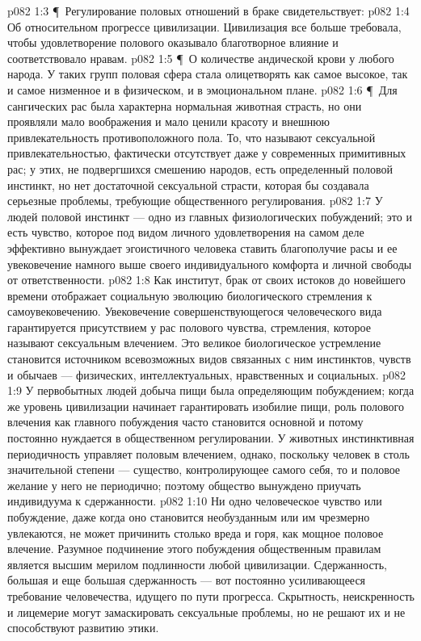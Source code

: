 \vs p082 1:3 \P\ Регулирование половых отношений в браке свидетельствует:
\vs p082 1:4 \bibnobreakspace Об относительном прогрессе цивилизации. Цивилизация все больше требовала, чтобы удовлетворение полового оказывало благотворное влияние и соответствовало нравам.
\vs p082 1:5 \P\ \bibnobreakspace О количестве андической крови у любого народа. У таких групп половая сфера стала олицетворять как самое высокое, так и самое низменное и в физическом, и в эмоциональном плане.
\vs p082 1:6 \P\ Для сангических рас была характерна нормальная животная страсть, но они проявляли мало воображения и мало ценили красоту и внешнюю привлекательность противоположного пола. То, что называют сексуальной привлекательностью, фактически отсутствует даже у современных примитивных рас; у этих, не подвергшихся смешению народов, есть определенный половой инстинкт, но нет достаточной сексуальной страсти, которая бы создавала серьезные проблемы, требующие общественного регулирования.
\vs p082 1:7 У людей половой инстинкт --- одно из главных физиологических побуждений; это и есть чувство, которое под видом личного удовлетворения на самом деле эффективно вынуждает эгоистичного человека ставить благополучие расы и ее увековечение намного выше своего индивидуального комфорта и личной свободы от ответственности.
\vs p082 1:8 Как институт, брак от своих истоков до новейшего времени отображает социальную эволюцию биологического стремления к самоувековечению. Увековечение совершенствующегося человеческого вида гарантируется присутствием у рас полового чувства, стремления, которое называют сексуальным влечением. Это великое биологическое устремление становится источником всевозможных видов связанных с ним инстинктов, чувств и обычаев --- физических, интеллектуальных, нравственных и социальных.
\vs p082 1:9 У первобытных людей добыча пищи была определяющим побуждением; когда же уровень цивилизации начинает гарантировать изобилие пищи, роль полового влечения как главного побуждения часто становится основной и потому постоянно нуждается в общественном регулировании. У животных инстинктивная периодичность управляет половым влечением, однако, поскольку человек в столь значительной степени --- существо, контролирующее самого себя, то и половое желание у него не периодично; поэтому общество вынуждено приучать индивидуума к сдержанности.
\vs p082 1:10 Ни одно человеческое чувство или побуждение, даже когда оно становится необузданным или им чрезмерно увлекаются, не может причинить столько вреда и горя, как мощное половое влечение. Разумное подчинение этого побуждения общественным правилам является высшим мерилом подлинности любой цивилизации. Сдержанность, большая и еще большая сдержанность --- вот постоянно усиливающееся требование человечества, идущего по пути прогресса. Скрытность, неискренность и лицемерие могут замаскировать сексуальные проблемы, но не решают их и не способствуют развитию этики.
